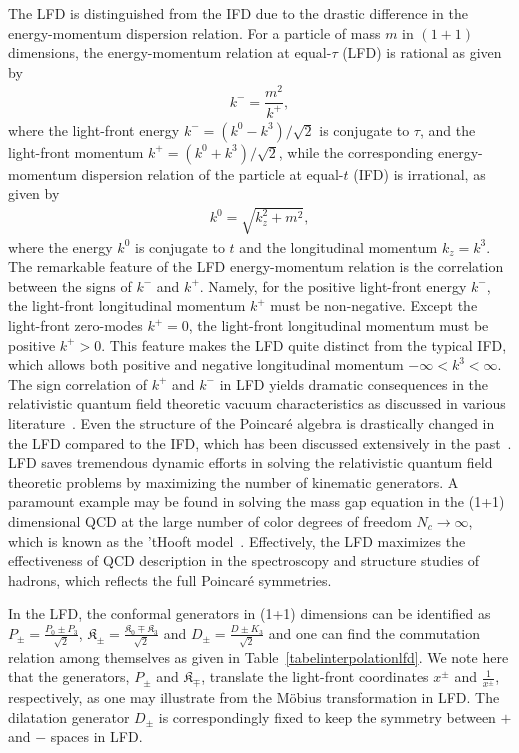 \documentclass[%
 reprint,
superscriptaddress,
 amsmath,amssymb,
 aps,
]{revtex4-2}
\begin{document}
The LFD is distinguished from the IFD due to the drastic difference in the energy-momentum dispersion relation. For a particle of mass $m$ in $(1+1)$ dimensions, the energy-momentum relation at equal-$\tau$ (LFD) is rational as given by
\begin{align}
  k^{-}=\dfrac{m^{2}}{k^{+}}, \label{eqn:E-P_relation_LF}
\end{align}
where the light-front energy $k^{-}=(k^{0}-k^{3})/\sqrt{2}$ is conjugate to $\tau$, and the light-front momentum $k^{+}=(k^{0}+k^{3})/\sqrt{2}$,
while the corresponding energy-momentum dispersion relation of the particle at equal-$t$ (IFD) is irrational, as given by
\begin{align}
  k^{0}=\sqrt{k_z^{2}+m^{2}}, \label{eqn:E-P_relation_IF}
\end{align}
where the energy $k^{0}$ is conjugate to $t$ and the longitudinal momentum $k_z = k^{3}$. 
The remarkable feature of the LFD energy-momentum relation is the correlation between the signs of $k^{-}$ and $k^{+}$. Namely, for the positive light-front energy $k^{-}$, the light-front longitudinal momentum $k^{+}$ must be non-negative.
Except the light-front zero-modes $k^{+}=0$, the light-front longitudinal momentum must be positive $k^{+}>0$. This feature makes the LFD quite distinct from the typical IFD, which allows both positive and negative longitudinal momentum $-\infty < k^3 < \infty$. The sign correlation of $k^+$ and $k^-$ in LFD yields dramatic consequences in the relativistic quantum field theoretic vacuum characteristics as discussed in various literature~\cite{Brodsky_1998, BrodskyLightFrontMethodsandNonPerturbativeQCD, harindranath1998introductionlightfrontdynamicspedestrians, ji2023relativistic}. 
Even the structure of the Poincar\'e algebra is drastically changed in the LFD compared to the IFD, which has been discussed extensively in the past~\cite{Ji2001}.
LFD saves tremendous dynamic efforts in solving the relativistic quantum field theoretic problems by maximizing the number of kinematic generators. 
A paramount example may be found in solving the mass gap equation in the (1+1) dimensional QCD at the large number of color degrees of freedom $N_c \to \infty$, which is known as the 'tHooft model~\cite{THOOFT1974461, Ji2021QCD, ji2023relativistic}. Effectively, the LFD maximizes the effectiveness of QCD description in the spectroscopy and structure studies of hadrons, which reflects the full Poincar\'e symmetries.

In the LFD, the conformal generators in (1+1) dimensions can be identified as 
$P_{\pm}=\frac{P_{0}\pm P_{3}}{\sqrt{2}}$, $\mathfrak{K}_{\pm}=\frac{\mathfrak{K}_{0}\mp \mathfrak{K}_{3}}{\sqrt{2}}$ and $D_{\pm}=\frac{D\pm{K_{3}}}{\sqrt{2}}$ and one can find the commutation relation among themselves 
as given in Table~\ref{tabelinterpolationlfd}. 
We note here that the generators, $P_{\pm}$ and $\mathfrak{K}_{\mp} $, translate the light-front coordinates $x^{\pm}$ and $\frac{1}{x^{\pm}}$, respectively, as one may illustrate from the M\"{o}bius transformation in LFD. The dilatation generator $D_{\pm}$ is correspondingly fixed to keep the symmetry between $+$ and $-$ spaces in LFD.
\end{document}
